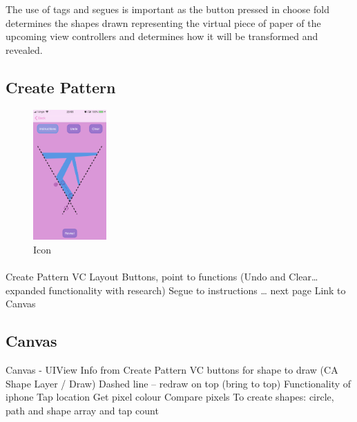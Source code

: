\documentclass[11pt]{article}
\begin{document}
            The use of tags and segues is important as the button pressed in choose fold determines the shapes drawn representing the virtual piece of paper of the upcoming view controllers and determines how it will be transformed and revealed.
            
                
            \subsection{Create Pattern}
             \begin{figure}
                        \centering
                        \includegraphics[width=0.25\textwidth]{KiriZen/createPattern.png}
                        \caption{Icon}
                        \label{fig:kiriZen-createPattern}
                    \end{figure}
                    
                \paragraph{} 
                Create Pattern VC
                Layout Buttons, point to functions (Undo and Clear… expanded functionality with research)
                Segue to instructions … next page
                Link to Canvas


            \subsection{Canvas}
            
            Canvas - UIView
            Info from Create Pattern VC buttons for shape to draw (CA Shape Layer / Draw)
            Dashed line – redraw on top (bring to top)
            Functionality of iphone
            Tap location
            Get pixel colour
            Compare pixels
            To create shapes: circle, path and shape array and tap count
            
\end{document}
